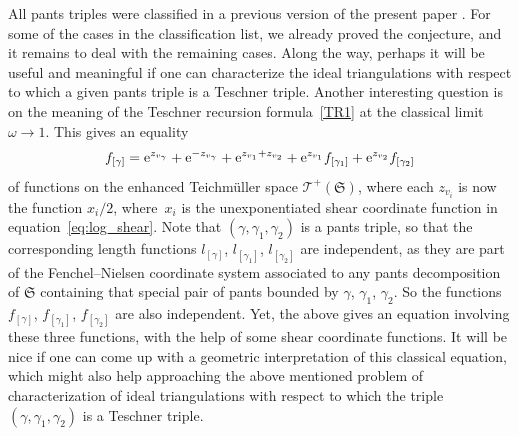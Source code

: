 \documentclass[pdftex]{sigma}
\numberwithin{equation}{section}
\theoremstyle{definition}
\begin{document}
All pants triples were classified in a previous version of the present paper \cite{ver3}. For some of the cases in the classification list, we already proved the conjecture, and it remains to deal with the remaining cases. Along the way, perhaps it will be useful and meaningful if one can characterize the ideal triangulations with respect to which a given pants triple is a Teschner triple.
Another interesting question is on the meaning of the Teschner recursion formula~\ref{TR1} at the classical limit $\omega \to 1$. This gives an equality
\[
f_{[\gamma]} = {\rm e}^{z_{v_\gamma}} + {\rm e}^{-z_{v_\gamma}} + {\rm e}^{z_{v_1} + z_{v_2}} + {\rm e}^{z_{v_1}} f_{[\gamma_1]} + {\rm e}^{z_{v_2}} f_{[\gamma_2]}
\]
of functions on the enhanced Teichm\"uller space $\mathscr{T}^+(\mathfrak{S})$, where each $z_{v_i}$ is now the function $x_i/2$, where~$x_i$ is the unexponentiated shear coordinate function in equation~\eqref{eq:log_shear}. Note that $(\gamma,\gamma_1,\gamma_2)$ is a pants triple, so that the corresponding length functions $l_{[\gamma]}$, $l_{[\gamma_1]}$, $l_{[\gamma_2]}$ are independent, as they are part of the Fenchel--Nielsen coordinate system associated to any pants decomposition of $\mathfrak{S}$ containing that special pair of pants bounded by $\gamma$, $\gamma_1$, $\gamma_2$. So the functions $f_{[\gamma]}$, $f_{[\gamma_1]}$, $f_{[\gamma_2]}$ are also independent. Yet, the above gives an equation involving these three functions, with the help of some shear coordinate functions. It will be nice if one can come up with a geometric interpretation of this classical equation, which might also help approaching the above mentioned problem of characterization of ideal triangulations with respect to which the triple $(\gamma,\gamma_1,\gamma_2)$ is a Teschner triple.
\end{document}
